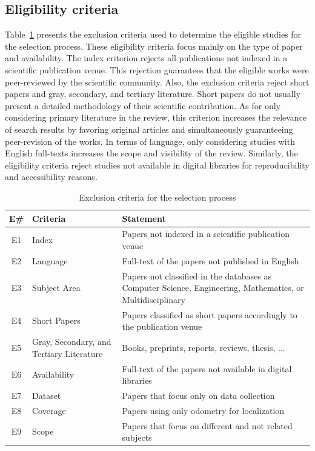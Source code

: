 \documentclass[10pt,a4paper,notitlepage,twocolumn,oneside]{article}
\begin{document}
\subsection{Eligibility criteria}
\label{sec:methodology:eligible}

Table~\ref{tab:methodology:exclusion-criteria} presents the exclusion criteria used to determine the eligible studies for the selection process. These eligibility criteria focus mainly on the type of paper and availability. The index criterion rejects all publications not indexed in a scientific publication venue. This rejection guarantees that the eligible works were peer-reviewed by the scientific community. Also, the exclusion criteria reject short papers and gray, secondary, and tertiary literature. Short papers do not usually present a detailed methodology of their scientific contribution. As for only considering primary literature in the review, this criterion increases the relevance of search results by favoring original articles and simultaneously guaranteeing peer-revision of the works. In terms of language, only considering studies with English full-texts increases the scope and visibility of the review. Similarly, the eligibility criteria reject studies not available in digital libraries for reproducibility and accessibility reasons.

\begin{table}[h]
  \renewcommand{\arraystretch}{1.25}
  \setlength{\tabcolsep}{3pt}
  \caption[Exclusion criteria for the selection process]{Exclusion criteria for the selection process}
  \vspace{0.5em}
  \label{tab:methodology:exclusion-criteria}
  \centering
  {\scriptsize
  \begin{tabular}{c m{} m{}}

\hline
\textbf{E\#} & \textbf{Criteria} & \textbf{Statement}\\
\hline
E1 &
Index &
Papers not indexed in a scientific publication venue\\
\hline
E2 &
Language &
Full-text of the papers not published in English\\
\hline
E3 &
Subject Area &
Papers not classified in the databases as Computer Science, Engineering, Mathematics, or Multidisciplinary\\
\hline
E4 &
Short Papers &
Papers classified as short papers accordingly to the publication venue\\
\hline
E5 &
Gray, Secondary, and Tertiary Literature &
Books, preprints, reports, reviews, thesis, ...\\
\hline
E6 &
Availability &
Full-text of the papers not available in digital libraries\\
\hline
E7 &
Dataset &
Papers that focus only on data collection\\
\hline
E8 &
Coverage &
Papers using only odometry for localization\\
\hline
E9 &
Scope &
Papers that focus on different and not related subjects\\
\hline

  \end{tabular}}
\end{table}
\end{document}
